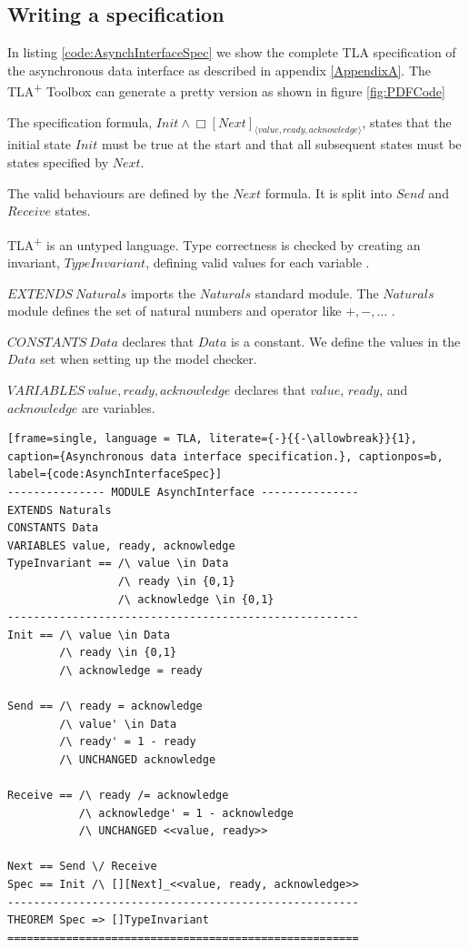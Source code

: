 \subsection{Writing a specification}

In listing \ref{code:AsynchInterfaceSpec} we show the complete TLA specification of the 
asynchronous data interface as described in appendix \ref{AppendixA}. The TLA\textsuperscript{+} Toolbox can generate a 
pretty version as shown in figure \ref{fig:PDFCode}

The specification formula, \( Init \land \Box\left[ Next \right]_{\langle value, ready, acknowledge \rangle} \),
states that the initial state \(Init\) must be true at the start and that all 
subsequent states must be states specified by \(Next\).

The valid behaviours are defined by the \(Next\) formula. It is split into \(Send\) and \(Receive\) states.

TLA\textsuperscript{+} is an untyped language. Type correctness is checked by creating an invariant, 
\(TypeInvariant\), defining valid values for each variable \parencite{SpecifyingSystems}.

\(EXTENDS \ Naturals\) imports the \(Naturals\) standard module. The \( Naturals\) module defines the set of natural
numbers and operator like \(+, -, \dots\) \parencite{ModelCheckingTLASpecifications}.

\(CONSTANTS\  Data\) declares that \(Data\) is a constant. We define the values in the 
\(Data\) set when setting up the model checker.

\( VARIABLES \ value, ready, acknowledge\) declares that \(value\), \(ready\), and \(acknowledge\) are variables.

\vspace{5mm} %

\begin{lstlisting}[frame=single, language = TLA, literate={-}{{-\allowbreak}}{1}, caption={Asynchronous data interface specification.}, captionpos=b, label={code:AsynchInterfaceSpec}]
--------------- MODULE AsynchInterface ---------------
EXTENDS Naturals
CONSTANTS Data
VARIABLES value, ready, acknowledge
TypeInvariant == /\ value \in Data
                 /\ ready \in {0,1}
                 /\ acknowledge \in {0,1}             
------------------------------------------------------
Init == /\ value \in Data
        /\ ready \in {0,1}
        /\ acknowledge = ready
        
Send == /\ ready = acknowledge
        /\ value' \in Data
        /\ ready' = 1 - ready
        /\ UNCHANGED acknowledge
        
Receive == /\ ready /= acknowledge
           /\ acknowledge' = 1 - acknowledge
           /\ UNCHANGED <<value, ready>>
              
Next == Send \/ Receive
Spec == Init /\ [][Next]_<<value, ready, acknowledge>>
------------------------------------------------------
THEOREM Spec => []TypeInvariant
======================================================
\end{lstlisting}

